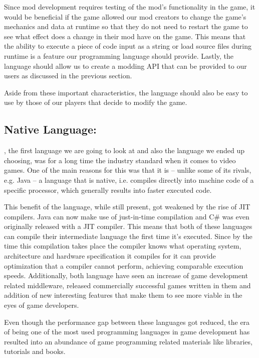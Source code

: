 Since mod development requires testing of the mod's functionality in the game, it would be beneficial if the game allowed
our mod creators to change the game's mechanics and data at runtime so that they do not need to restart the game
to see what effect does a change in their mod have on the game. This means that the ability to execute a piece of code
input as a string or load source files during runtime is a feature our programming language should provide.
Lastly, the language should allow us to create a modding API that can be provided to our users as discussed in the previous section.

Aside from these important characteristics, the language should also be easy to use by those of our players that decide to
modify the game.

\subsection{Native Language: \protect\cpp}

\cpp, the first language we are going to look at and also the language we ended up choosing, was for a long time the
industry standard when it comes to video games. One of the main reasons for this was that it is -- unlike some of its
rivals, e.g. Java -- a language that is native, i.e. compiles directly into machine code of a specific processor, 
which generally results into faster executed code.

This benefit of the language, while still present, got weakened by the rise of JIT compilers. Java can now make use of just-in-time
compilation and C\# was even originally released with a JIT compiler. This means that both of these languages can
compile their intermediate language the first time it's executed. Since by the time this compilation takes place the
compiler knows what operating system, architecture and hardware specification it compiles for it can provide optimization that
a \cpp compiler cannot perform, achieving comparable execution speeds. Additionally, both language have seen an increase of game
development related middleware, released commercially successful games written in them and addition of new interesting features
that make them to see more viable in the eyes of game developers.

Even though the performance gap between these languages got reduced, the era of \cpp being one of the most used programming languages
in game development has resulted into an abundance of game programming related materials like libraries, tutorials and books.

